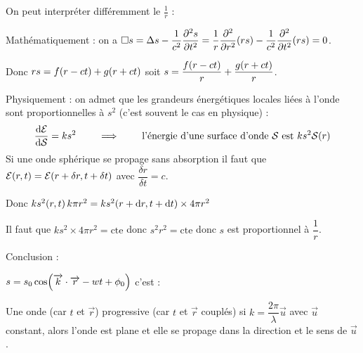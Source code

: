 \documentclass[a4paper,french,bookmarks]{book}
\begin{document}
    On peut interpréter différemment le $\frac{1}{r}$ :
    \begin{enumerate}
        \itt Mathématiquement : on a $\Box s = \Delta s - \dfrac{1}{c^2}\dfrac{\partial^2 s}{\partial t^2} = \dfrac{1}{r}\dfrac{\partial^2}{\partial r^2}\!\left(rs\right) - \dfrac{1}{c^2}\dfrac{\partial^2}{\partial t^2}\!\left(rs\right) = 0$.
        
        Donc  $rs = f\!\left(r - ct\right) + g\!\left(r + ct\right)$ soit $s = \dfrac{f\!\left(r - ct\right)}{r} + \dfrac{g\!\left(r + ct\right)}{r}$.
        
        \itt Physiquement : on admet que les grandeurs énergétiques locales liées à l'onde sont proportionnelles à $s^2$ (c'est souvent le cas en physique) :
        \[ \dfrac{\mathrm d \mathcal{E}}{\mathrm d \mathcal{S}} = ks^2 \qquad\implies\qquad \text{l'énergie d'une surface d'onde $\mathcal{S}$ est $ks^2\mathcal{S}\!\left(r\right)$}\]
        Si une onde sphérique se propage sans absorption il faut que $\mathcal{E}\!\left(r, t\right) = \mathcal{E}\!\left(r + \delta r, t + \delta t\right)$ avec $\dfrac{\delta r}{\delta t} = c$.
        
        Donc $ks^2\!\left(r, t\right)k\pi r^2 = ks^2\!\left(r + \mathrm d r, t + \mathrm d t\right)\times 4\pi r^2$
        
        Il faut que $ks^2\times 4\pi r^2 = \text{cte}$ donc $s^2r^2 = \text{cte}$ donc $s$ est proportionnel à $\dfrac{1}{r}$.
        
    \end{enumerate}

    Conclusion : 
    
    $s = s_0 \cos \!\left(\overrightarrow{k} \cdot \overrightarrow{r} - w t + \phi_0\right)$ c'est :
    
    \begin{enumerate}
        \itt Une onde (car $t$ et $\vec r$)
        \itt progressive (car $t$ et $\vec r$ couplés)
        \itt si $k = \dfrac{2\pi}{\lambda}\vec u$ avec $\vec u$ constant, alors l'onde est plane et elle se propage dans la direction et le sens de $\vec u$.
    \end{enumerate}
\end{document}

